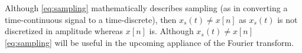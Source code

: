 Although \eqref{eq:sampling} mathematically describes sampling (as in converting a time-continuous signal to a time-discrete), then $x_s(t) \neq x[n]$ as $x_s(t)$ is not discretized in amplitude whereas $x[n]$ is. Although $x_s(t) \neq x[n]$ \eqref{eq:sampling} will be useful in the upcoming appliance of the Fourier transform.
